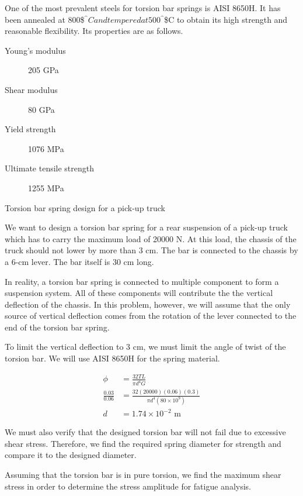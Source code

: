 \documentclass[a4paper,openany,12pt]{book}
\begin{document}
{{One of the most prevalent steels for torsion bar springs is AISI 8650H.
It has been annealed at 800\$\(^{\^{}} C and tempered at 500\)\(^{\^{}}\)\$C to
obtain its high strength and reasonable flexibility. Its properties are
as follows.

\begin{description}
\item[{Young's modulus}] 205 GPa

\item[{Shear modulus}] 80 GPa

\item[{Yield strength}] 1076 MPa

\item[{Ultimate tensile strength}] 1255 MPa
\end{description}

Torsion bar spring design for a pick-up truck

We want to design a torsion bar spring for a rear suspension of a
pick-up truck which has to carry the maximum load of 20000 N. At this
load, the chassis of the truck should not lower by more than 3 cm. The
bar is connected to the chassis by a 6-cm lever. The bar itself is 30 cm
long.

In reality, a torsion bar spring is connected to multiple component to
form a suspension system. All of these components will contribute the
the vertical deflection of the chassis. In this problem, however, we
will assume that the only source of vertical deflection comes from the
rotation of the lever connected to the end of the torsion bar spring.

To limit the vertical deflection to 3 cm, we must limit the angle of
twist of the torsion bar. We will use AISI 8650H for the spring
material.

$$\begin{aligned}
    \phi &= \frac{32TL}{\pi d^4 G} \\
    \frac{0.03}{0.06}  &= \frac{32(20000)(0.06)(0.3)}{\pi d^4 (80 \times 10^9)} \\
    d &= 1.74 \times 10^{-2} \text{ m}
  \end{aligned}$$

We must also verify that the designed torsion bar will not fail due to
excessive shear stress. Therefore, we find the required spring diameter
for strength and compare it to the designed diameter.

Assuming that the torsion bar is in pure torsion, we find the maximum
shear stress in order to determine the stress amplitude for fatigue
analysis.

}}
\end{document}
